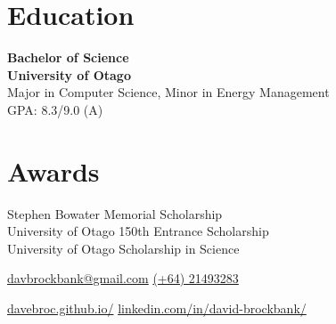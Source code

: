 \documentclass[lighthipster]{simplehipstercv}
\begin{document}
    \begin{minipage}[t]{1\textwidth}
    \section*{Education}
    
    \textbf{Bachelor of Science}\\
    \textbf{University of Otago}\\
    Major in Computer Science, Minor in Energy Management\\
    GPA: 8.3/9.0 (A)\\
    
    \end{minipage}
    \bigskip
    
    \begin{minipage}[t]{1\textwidth}
    \section*{Awards}
    Stephen Bowater Memorial Scholarship\\
    University of Otago 150th Entrance Scholarship\\
    University of Otago Scholarship in Science
    \bigskip
    
    \end{minipage}\hfill
    \bigskip
    \bigskip
    \bigskip
    \bigskip
\setlength{\parindent}{0pt}

\begin{minipage}[t]{1\textwidth}
\fontfamily{\sfdefault}\selectfont \color{black!70}
{\begin{center}\small 
    \href{mailto:davbrockbank@gmail.com}{ davbrockbank@gmail.com}  
    \href{tel:021493283}{ (+64) 21493283}  
 \end{center}
\begin{center}
    \href{https://davebroc.github.io/}{davebroc.github.io/}
    \href{https://www.linkedin.com/in/david-brockbank/}{linkedin.com/in/david-brockbank/}
\end{center}
}
\end{minipage}
\end{document}
